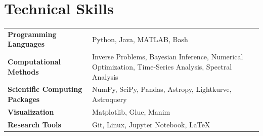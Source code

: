 \section{Technical Skills}

\begin{tabularx}{\linewidth}{@{}lX@{}}
\textbf{Programming Languages} & Python, Java, MATLAB, Bash \\
\textbf{Computational Methods} & Inverse Problems, Bayesian Inference, Numerical Optimization, Time-Series Analysis, Spectral Analysis \\
\textbf{Scientific Computing Packages} & NumPy, SciPy, Pandas, Astropy, Lightkurve, Astroquery \\
\textbf{Visualization} & Matplotlib, Glue, Manim \\
\textbf{Research Tools} & Git, Linux, Jupyter Notebook, \LaTeX \\
\end{tabularx}